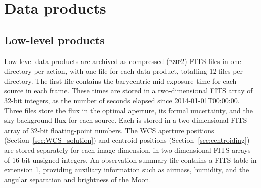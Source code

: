 \documentclass[fleqn,usenatbib]{mnras}
\begin{document}







\section{Data products}\label{sec:data_products}

\subsection{Low-level products}\label{sec:lowlevelproducts}


Low-level data products are archived as compressed (\textsc{bzip2}) FITS files in one directory per action, with one file for each data product, totalling 12 files per directory. The first file contains the barycentric mid-exposure time for each source in each frame. These times are stored in a two-dimensional FITS array of 32-bit integers, as the number of seconds elapsed since 2014-01-01T00:00:00. Three files store the flux in the optimal aperture, its formal uncertainty, and the sky background flux for each source. Each is stored in a two-dimensional FITS array of 32-bit floating-point numbers. The WCS aperture positions (Section~\ref{sec:WCS_solution}) and centroid positions (Section~\ref{sec:centroiding}) are stored separately for each image dimension, in two-dimensional FITS arrays of 16-bit unsigned integers. An observation summary file contains a FITS table in extension 1, providing auxiliary information such as airmass, humidity, and the angular separation and brightness of the Moon.
\end{document}

